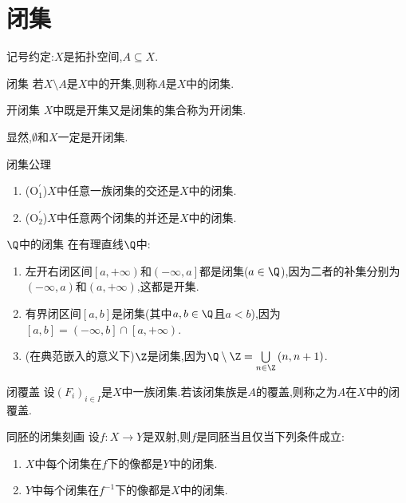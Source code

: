 \section{闭集}

记号约定:$X$是拓扑空间,$A\subseteq X$.

\begin{definition}{闭集}{}
	若$X\setminus A$是$X$中的开集,则称$A$是$X$中的闭集.
\end{definition}

\begin{definition}{开闭集}{}
	$X$中既是开集又是闭集的集合称为开闭集.
\end{definition}

显然,$\emptyset$和$X$一定是开闭集.

\begin{proposition}{闭集公理}{}
	\begin{enumerate}
		\item ($\mathrm{O}_{1}^{\prime}$)$X$中任意一族闭集的交还是$X$中的闭集.
		\item ($\mathrm{O}_{2}^{\prime}$)$X$中任意两个闭集的并还是$X$中的闭集.
	\end{enumerate}
\end{proposition}

\begin{example}{$\Q$中的闭集}{}
	在有理直线$\Q$中:
	\begin{enumerate}
		\item 左开右闭区间$\left[a,+\infty\right)$和$\left(-\infty,a\right]$都是闭集($a\in\Q$),因为二者的补集分别为$\left(-\infty,a\right)$和$\left(a,+\infty\right)$,这都是开集.
		\item 有界闭区间$\left[a,b\right]$是闭集(其中$a,b\in\Q$且$a<b$),因为$\left[a,b\right]=\left(-\infty,b\right]\cap\left[a,+\infty\right)$.
		\item (在典范嵌入的意义下)$\Z$是闭集,因为$\Q\setminus\Z=\bigcup\limits_{n\in\Z}\left(n,n+1\right)$.
	\end{enumerate}
\end{example}

\begin{definition}{闭覆盖}{}
	设$\left(F_{i}\right)_{i\in I}$是$X$中一族闭集.若该闭集族是$A$的覆盖,则称之为$A$在$X$中的闭覆盖.
\end{definition}

\begin{proposition}{同胚的闭集刻画}{}
	设$f:X\to Y$是双射,则$f$是同胚当且仅当下列条件成立:
	\begin{enumerate}
		\item $X$中每个闭集在$f$下的像都是$Y$中的闭集.
		\item $Y$中每个闭集在$f^{-1}$下的像都是$X$中的闭集.
	\end{enumerate}
\end{proposition}
